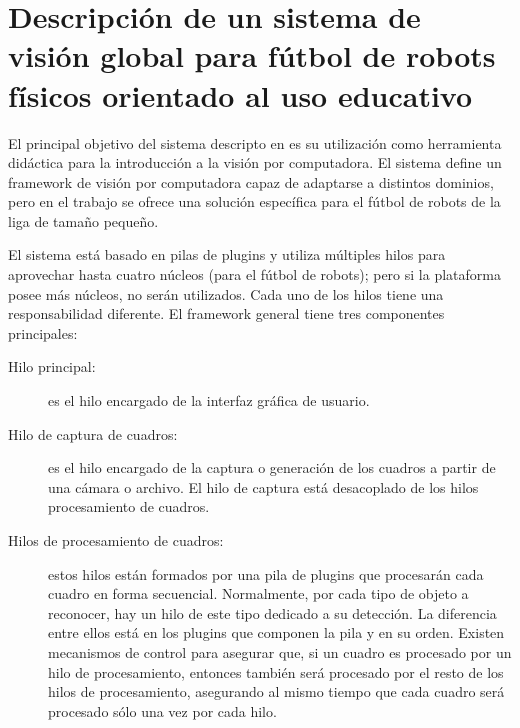 
\section{Descripción de un sistema de visión global para fútbol de robots físicos
orientado al uso educativo}


\label{descripcionSistemaBase}

El principal objetivo del sistema descripto en \cite{torres2014} es su
utilización como herramienta didáctica para la introducción a la visión por
computadora. El sistema define un framework de visión por computadora capaz de
adaptarse a distintos dominios, pero en el trabajo se ofrece una solución
específica para el fútbol de robots de la liga de tamaño pequeño.

El sistema está basado en pilas de plugins y utiliza múltiples hilos para
aprovechar hasta cuatro núcleos (para el fútbol de robots); pero si la
plataforma posee más núcleos, no serán utilizados. Cada uno de los hilos tiene
una responsabilidad diferente. El framework general tiene tres componentes
principales:

\begin{description}

	\item[Hilo principal:] es el hilo encargado de la interfaz gráfica de
		usuario.

	\item[Hilo de captura de cuadros:] es el hilo encargado de la captura o
		generación de los cuadros a partir de una cámara o archivo. El
		hilo de captura está desacoplado de los hilos procesamiento de
		cuadros.

	\item[Hilos de procesamiento de cuadros:] estos hilos están formados por
		una pila de plugins que procesarán cada cuadro en forma
		secuencial. Normalmente, por cada tipo de objeto a reconocer,
		hay un hilo de este tipo dedicado a su detección. La diferencia
		entre ellos está en los plugins que componen la pila y en su
		orden. Existen mecanismos de control para asegurar que, si un
		cuadro es procesado por un hilo de procesamiento, entonces
		también será procesado por el resto de los hilos de
		procesamiento, asegurando al mismo tiempo que cada cuadro será
		procesado sólo una vez por cada hilo.

\end{description}

